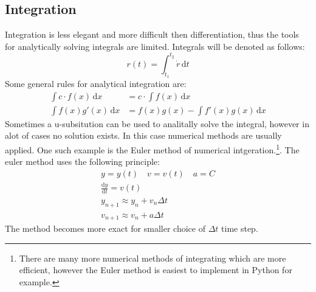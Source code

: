 \documentclass[11pt, a4paper]{article}
\renewcommand*{\d}{\text{d}}
\begin{document}
\subsection{Integration}
Integration is less elegant and more difficult then differentiation, thus the tools for analytically solving integrals are limited. Integrals will be denoted as follows:
\begin{equation*}
  r(t) = \int_{t_1}^{t_2} \dot{r}\,\d t
\end{equation*}
Some general rules for analytical integration are:
\begin{align*}
  \int c\cdot f(x)\,\d x &= c \cdot \int f(x)\,\d x\\
  \int f(x)g'(x)\,\d x &= f(x)g(x) - \int f'(x) g(x)\,\d x
\end{align*}
Sometimes a u-subsitution can be used to analitally solve the integral, however in alot of cases no solution exists. In this case numerical methods are usually applied. One such example is the Euler method of numerical intgeration.\footnote{There are many more numerical methods of integrating which are more efficient, however the Euler method is easiest to implement in Python for example.}. The euler method uses the following principle:
\begin{gather*}
  y = y(t) \quad v = v(t) \quad a = C\\
  \frac{\d y}{\d t} = v(t)\\
  y_{n+1} \approx y_n + v_n\Delta t\\
  v_{n+1} \approx v_n + a\Delta t
\end{gather*}
The method becomes more exact for smaller choice of $\Delta t$ time step.
\end{document}
